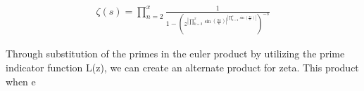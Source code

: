 \documentclass{article}
\begin{document}
\begin{align*}
\zeta(s) = \prod_{n=2}^x \frac{1}{1 - \left( z^{{|\prod_{k=2}^x \sin\left(\frac{\pi z}{k}\right)|}^{|\prod_{k=2}^x \sin\left(\frac{\pi z}{k}\right)|}} \right)^{-s}}
\end{align*}

Through substitution of the primes in the euler product by utilizing the prime indicator function L(z), we can create an alternate product for zeta. This product when e
\newpage
\nocite{*}
\printbibliography
\end{document}
